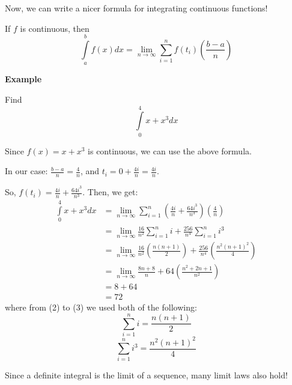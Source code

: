 Now, we can write a nicer formula for integrating continuous functions!

If $ f $ is continuous, then
\[ \int\limits_{a}^{b} f(x) d{x} =
    \lim\limits_{{n} \to {\infty}} \sum\limits_{i=1}^{n} f(t_i)\left(\frac{b-a}{n}\right) \]

\textbf{Example}

Find
\[ \int\limits_{0}^{4} x+x^3 d{x} \]

Since $ f(x)=x+x^3 $ is continuous, we can use the above formula.

In our case: $ \frac{b-a}{n} = \frac{4}{n} $, and $ t_i = 0+\frac{4i}{n} = \frac{4i}{n} $.

So, $ f(t_i) = \frac{4i}{n} + \frac{64i^3}{n^3} $.
Then, we get:
\begin{align}
    \int\limits_{0}^{4} x+x^3 d{x}
     & = \lim\limits_{{n} \to {\infty}} \sum\limits_{i=1}^{n}
    \left( \frac{4i}{n} +\frac{64i^3}{n^3} \right)\left( \frac{4}{n} \right)                  \\
     & = \lim\limits_{{n} \to {\infty}} \frac{16}{n^2} \sum\limits_{i=1}^{n} i +
    \frac{256}{n^4} \sum\limits_{i=1}^{n} i^3                                                 \\
     & = \lim\limits_{{n} \to {\infty}} \frac{16}{n^2} \left( \frac{n(n+1)}{2} \right) +
    \frac{256}{n^4} \left( \frac{n^2(n+1)^2}{4} \right)                                       \\
     & = \lim\limits_{{n} \to {\infty}} \frac{8n+8}{n} +64 \left(\frac{n^2+2n+1}{n^2} \right) \\
     & = 8+64                                                                                 \\
     & =72
\end{align}
where from (2) to (3) we used both of the following:
\[ \sum\limits_{i=1}^{n} i=\frac{n(n+1)}{2} \]
\[ \sum\limits_{i=1}^{n} i^3=\frac{n^2(n+1)^2}{4} \]

Since a definite integral is the limit of a sequence, many limit laws also hold!

